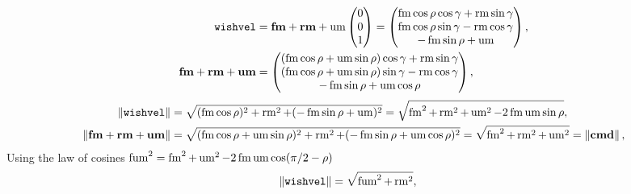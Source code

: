 \begin{align*}
\texttt{wishvel} &= \vec{\fmove} + \vec{\rmove} + \umove
\begin{pmatrix}
0\\0\\1
\end{pmatrix} =
\begin{pmatrix}
\fmove \cos\rho\cos\gamma + \rmove \sin\gamma\\
\fmove \cos\rho\sin\gamma - \rmove \cos\gamma\\
-\fmove \sin\rho + \umove
\end{pmatrix},\\
\vec{\fmove} + \vec{\rmove} + \vec{\umove} &=
\begin{pmatrix}
(\fmove \cos\rho + \umove \sin\rho)\cos\gamma + \rmove \sin\gamma\\
(\fmove \cos\rho + \umove \sin\rho)\sin\gamma - \rmove \cos\gamma\\
-\fmove \sin\rho + \umove \cos\rho
\end{pmatrix},
\end{align*}
\begin{align*}
\norm{\texttt{wishvel}} &= \sqrt{(\fmove \cos\rho)^2 + \rmove^2 + (-\fmove \sin\rho + \umove)^2} = \sqrt{\fmove^2 + \rmove^2 + \umove^2  - 2\fmove\umove\sin\rho},\\
\norm{\vec{\fmove} + \vec{\rmove} + \vec{\umove}} &= \sqrt{(\fmove \cos\rho + \umove \sin\rho)^2 + \rmove^2 + (-\fmove \sin\rho + \umove \cos\rho)^2} = \sqrt{\fmove^2 + \rmove^2 + \umove^2} = \norm{\vec{\cmd}},
\end{align*}
Using the law of cosines $\fumove^2 = \fmove^2 + \umove^2 - 2\fmove\umove\cos(\pi/2 - \rho)$
\begin{align*}
\norm{\texttt{wishvel}} &= \sqrt{\fumove^2 + \rmove^2},
\end{align*}

